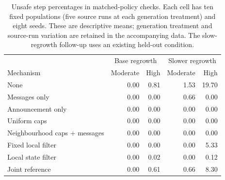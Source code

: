 \begin{table}[t]\centering\small
\begin{tabular}{lrrrr}\toprule
& \multicolumn{2}{c}{Base regrowth} & \multicolumn{2}{c}{Slower regrowth}\\
Mechanism & Moderate & High & Moderate & High\\\midrule
None & 0.00 & 0.81 & 1.53 & 19.70 \\
Messages only & 0.00 & 0.00 & 0.66 & 0.00 \\
Announcement only & 0.00 & 0.00 & 0.00 & 0.00 \\
Uniform caps & 0.00 & 0.00 & 0.00 & 0.00 \\
Neighbourhood caps + messages & 0.00 & 0.00 & 0.00 & 0.00 \\
Fixed local filter & 0.00 & 0.00 & 0.00 & 5.33 \\
Local state filter & 0.00 & 0.02 & 0.00 & 0.12 \\
Joint reference & 0.00 & 0.61 & 0.66 & 8.30 \\
\bottomrule\end{tabular}
\caption{Unsafe step percentages in matched-policy checks. Each cell has ten fixed populations (five source runs at each generation treatment) and eight seeds. These are descriptive means; generation treatment and source-run variation are retained in the accompanying data. The slow-regrowth follow-up uses an existing held-out condition.}
\label{tab:matched}\end{table}
